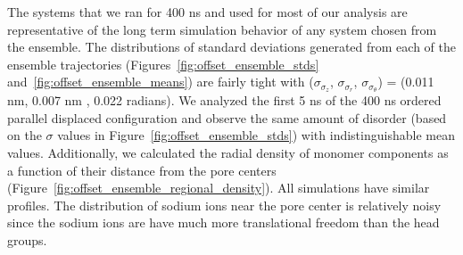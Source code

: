 \documentclass[journal=jpcbfk,manuscript=article]{achemso}
\begin{document}
  
  The systems that we ran for 400 ns and used for most of our analysis are
  representative of the long term simulation behavior of any system chosen from the 
  ensemble. The distributions of standard deviations generated from each of
  the ensemble trajectories (Figures~\ref{fig:offset_ensemble_stds} 
  and~\ref{fig:offset_ensemble_means}) are fairly tight with ($\sigma_{\sigma_z}$,
  $\sigma_{\sigma_r}$, $\sigma_{\sigma_\theta}$) = (0.011 nm, 0.007 nm , 0.022 radians).
  We analyzed the first 5 ns of the 400 ns ordered parallel displaced
  configuration and observe the same amount of disorder (based on the $\sigma$ values
  in Figure~\ref{fig:offset_ensemble_stds}) with indistinguishable 
  mean values. Additionally, we calculated the radial density of monomer components as a 
  function of their distance from the pore centers (Figure~\ref{fig:offset_ensemble_regional_density}).
  All simulations have similar profiles. The distribution of sodium ions near the
  pore center is relatively noisy since the sodium ions are have much more 
  translational freedom than the head groups. 
  
\end{document}

